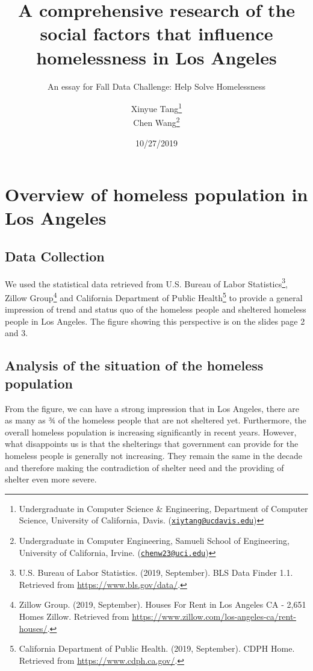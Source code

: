 \documentclass[]{article}
\title{A comprehensive research of the social factors that influence
homelessness in Los Angeles}
\subtitle{An essay for Fall Data Challenge: Help Solve Homelessness}
\author{Xinyue Tang\footnote{Undergraduate in Computer Science \& Engineering,
  Department of Computer Science, University of California, Davis.
  (\href{mailto:xiytang@ucdavis.edu}{\nolinkurl{xiytang@ucdavis.edu}})} \\ Chen Wang\footnote{Undergraduate in Computer Engineering, Samueli School
  of Engineering, University of California, Irvine.
  (\href{mailto:chenw23@uci.edu}{\nolinkurl{chenw23@uci.edu}})}}
\date{10/27/2019}
\let\rmarkdownfootnote\footnote%
\def\footnote{\protect\rmarkdownfootnote}
\begin{document}
\maketitle

{
\setcounter{tocdepth}{3}
\tableofcontents
}
\newpage

\hypertarget{overview-of-homeless-population-in-los-angeles}{%
\section{Overview of homeless population in Los
Angeles}\label{overview-of-homeless-population-in-los-angeles}}

\hypertarget{data-collection}{%
\subsection{Data Collection}\label{data-collection}}

We used the statistical data retrieved from U.S. Bureau of Labor
Statistics\footnote{U.S. Bureau of Labor Statistics. (2019, September).
  BLS Data Finder 1.1. Retrieved from \url{https://www.bls.gov/data/}.},
Zillow Group\footnote{Zillow Group. (2019, September). Houses For Rent
  in Los Angeles CA - 2,651 Homes \textbar{} Zillow. Retrieved from
  \url{https://www.zillow.com/los-angeles-ca/rent-houses/}.} and
California Department of Public Health\footnote{California Department of
  Public Health. (2019, September). CDPH Home. Retrieved from
  \url{https://www.cdph.ca.gov/}.} to provide a general impression of
trend and status quo of the homeless people and sheltered homeless
people in Los Angeles. The figure showing this perspective is on the
slides page 2 and 3.

\hypertarget{analysis-of-the-situation-of-the-homeless-population}{%
\subsection{Analysis of the situation of the homeless
population}\label{analysis-of-the-situation-of-the-homeless-population}}

From the figure, we can have a strong impression that in Los Angeles,
there are as many as ¾ of the homeless people that are not sheltered
yet. Furthermore, the overall homeless population is increasing
significantly in recent years. However, what disappoints us is that the
shelterings that government can provide for the homeless people is
generally not increasing. They remain the same in the decade and
therefore making the contradiction of shelter need and the providing of
shelter even more severe.
\end{document}
